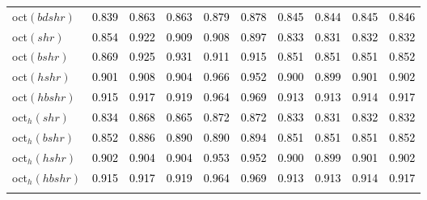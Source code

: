 \begin{tabular}[t]{l|ccccccccc}
oct$(bdshr)$ & \textcolor{black}{0.839} & \textcolor{black}{0.863} & \textcolor{black}{0.863} & \textcolor{black}{0.879} & \textcolor{black}{0.878} & \textcolor{black}{0.845} & \textcolor{black}{0.844} & \textcolor{black}{0.845} & \textcolor{black}{0.846}\\
oct$(shr)$ & \textcolor{black}{0.854} & \textcolor{black}{0.922} & \textcolor{black}{0.909} & \textcolor{black}{0.908} & \textcolor{black}{0.897} & \textcolor{black}{0.833} & \textcolor{black}{0.831} & \textcolor{black}{0.832} & \textcolor{black}{0.832}\\
oct$(bshr)$ & \textcolor{black}{0.869} & \textcolor{black}{0.925} & \textcolor{black}{0.931} & \textcolor{black}{0.911} & \textcolor{black}{0.915} & \textcolor{black}{0.851} & \textcolor{black}{0.851} & \textcolor{black}{0.851} & \textcolor{black}{0.852}\\
oct$(hshr)$ & \textcolor{black}{0.901} & \textcolor{black}{0.908} & \textcolor{black}{0.904} & \textcolor{black}{0.966} & \textcolor{black}{0.952} & \textcolor{black}{0.900} & \textcolor{black}{0.899} & \textcolor{black}{0.901} & \textcolor{black}{0.902}\\
oct$(hbshr)$ & \textcolor{black}{0.915} & \textcolor{black}{0.917} & \textcolor{black}{0.919} & \textcolor{black}{0.964} & \textcolor{black}{0.969} & \textcolor{black}{0.913} & \textcolor{black}{0.913} & \textcolor{black}{0.914} & \textcolor{black}{0.917}\\
oct$_h(shr)$ & \textcolor{black}{0.834} & \textcolor{black}{0.868} & \textcolor{black}{0.865} & \textcolor{black}{0.872} & \textcolor{black}{0.872} & \textcolor{black}{0.833} & \textcolor{black}{0.831} & \textcolor{black}{0.832} & \textcolor{black}{0.832}\\
oct$_h(bshr)$ & \textcolor{black}{0.852} & \textcolor{black}{0.886} & \textcolor{black}{0.890} & \textcolor{black}{0.890} & \textcolor{black}{0.894} & \textcolor{black}{0.851} & \textcolor{black}{0.851} & \textcolor{black}{0.851} & \textcolor{black}{0.852}\\
oct$_h(hshr)$ & \textcolor{black}{0.902} & \textcolor{black}{0.904} & \textcolor{black}{0.904} & \textcolor{black}{0.953} & \textcolor{black}{0.952} & \textcolor{black}{0.900} & \textcolor{black}{0.899} & \textcolor{black}{0.901} & \textcolor{black}{0.902}\\
oct$_h(hbshr)$ & \textcolor{black}{0.915} & \textcolor{black}{0.917} & \textcolor{black}{0.919} & \textcolor{black}{0.964} & \textcolor{black}{0.969} & \textcolor{black}{0.913} & \textcolor{black}{0.913} & \textcolor{black}{0.914} & \textcolor{black}{0.917}\\[-1.5ex]
\hline\\[-1.5ex]
\bottomrule
\end{tabular}
